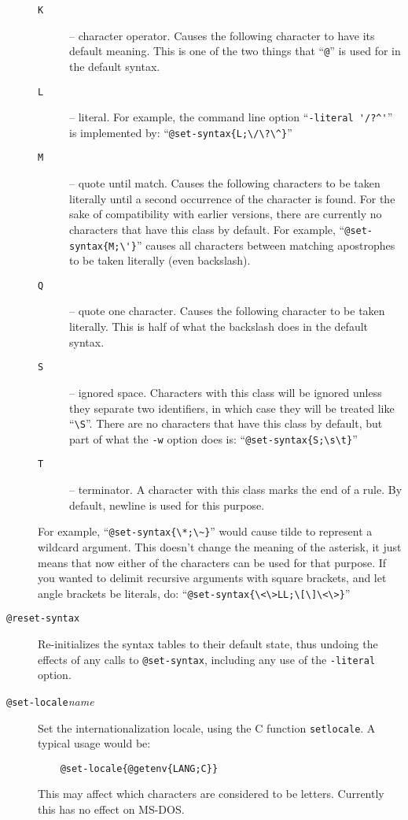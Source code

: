\begin{description}
\begin{description}
    \item[\tt K] -- character operator.  Causes the following character
	to have its default meaning.  This is one of the two things that
	``\verb/@/'' is used for in the default syntax.
    \item[\tt L] -- literal.  For example, the command line option 
	``\verb|-literal '/?^'|'' is implemented by:
	``\verb|@set-syntax{L;\/\?\^}|''
    \item[\tt M] -- quote until match.
	Causes the following characters to be taken literally until a
	second occurrence of the character is found.  For the sake of
	compatibility with earlier versions, there are currently no
	characters that have this class by default. 
	For example, ``\verb/@set-syntax{M;\'}/'' causes all characters
	between matching apostrophes to be taken literally (even backslash).
    \item[\tt Q] -- quote one character.  
	Causes the following character to be taken
	literally.  This is half of what the backslash does in the
	default syntax.
    \item[\tt S] -- ignored space.  Characters with this class will be
	ignored unless they separate two identifiers, in which case they
	will be treated like ``\verb/\S/''.  There are no characters
	that have this class by default, but part of what the \verb/-w/
	option does is: ``\verb/@set-syntax{S;\s\t}/''
    \item[\tt T] -- terminator.  A character with this class marks the
	end of a rule.  By default, newline is used for this purpose.
 \end{description}
For example,  ``\verb/@set-syntax{\*;\~}/'' would cause tilde to
represent a wildcard argument.  This doesn't change the meaning of the
asterisk, it just means that now either of the characters can be used
for that purpose.  If you wanted to delimit recursive arguments with
square brackets, and let angle brackets be literals, do:
``\verb/@set-syntax{\<\>LL;\[\]\<\>}/''

\item[{\tt @reset-syntax\ttlb\ttrb}]
Re-initializes the syntax tables to their default state, thus undoing the
effects of any calls to \verb|@set-syntax|, including any use of the
\verb/-literal/ option.

\item[{\tt @set-locale\ttlb}{\it name}{\tt \ttrb}]
Set the internationalization locale, using the C function
{\tt setlocale}.
A typical usage would be:
\begin{verbatim}
    @set-locale{@getenv{LANG;C}}
\end{verbatim}
This may affect which characters are considered to be letters.
Currently this has no effect on MS-DOS.
\end{description}

